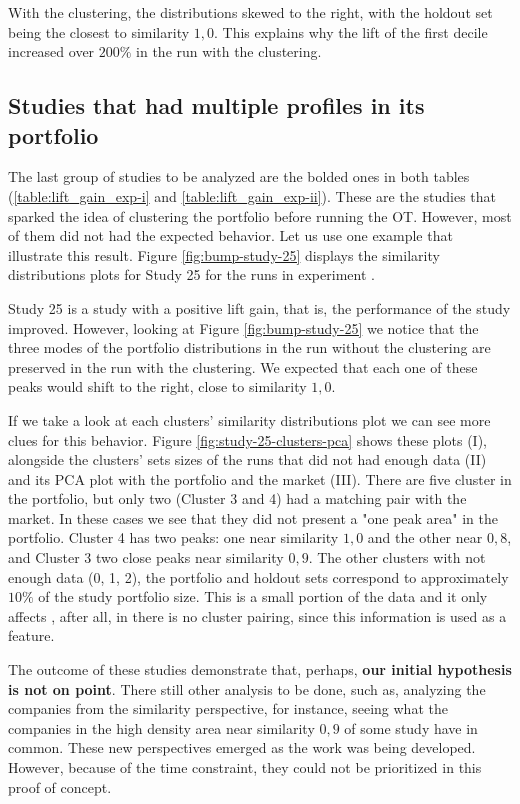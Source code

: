 With the clustering, the distributions skewed to the right, with the holdout set being the closest to similarity $1,0$. This explains why the lift of the first decile increased over $200\%$ in the run with the clustering.

\subsection{Studies that had multiple profiles in its portfolio}

The last group of studies to be analyzed are the bolded ones in both tables (\ref{table:lift_gain_exp-i} and \ref{table:lift_gain_exp-ii}). These are the studies that sparked the idea of clustering the portfolio before running the OT. However, most of them did not had the expected behavior. Let us use one example that illustrate this result. Figure \ref{fig:bump-study-25} displays the similarity distributions plots for Study 25 for the runs in experiment \nameExperimentII{}. 

Study 25 is a study with a positive lift gain, that is, the performance of the study improved. However, looking at Figure \ref{fig:bump-study-25} we notice that the three modes of the portfolio distributions in the run without the clustering are preserved in the run with the clustering. We expected that each one of these peaks would shift to the right, close to similarity $1,0$. 

If we take a look at each clusters' similarity distributions plot we can see more clues for this behavior. Figure \ref{fig:study-25-clusters-pca} shows these plots (I), alongside the clusters' sets sizes of the runs that did not had enough data (II) and its PCA plot with the portfolio and the market (III). There are five cluster in the portfolio, but only two (Cluster 3 and 4) had a matching pair with the market. In these cases we see that they did not present a "one peak area" in the portfolio. Cluster 4 has two peaks: one near similarity $1,0$ and the other near $0,8$, and Cluster 3 two close peaks near similarity $0,9$. The other clusters with not enough data (0, 1, 2), the portfolio and holdout sets correspond to approximately $10\%$ of the study portfolio size. This is a small portion of the data and it only affects \nameExperimentI{}, after all, in \nameExperimentII{} there is no cluster pairing, since this information is used as a feature.

The outcome of these studies demonstrate that, perhaps, \textbf{our initial hypothesis is not on point}. There still other analysis to be done, such as, analyzing the companies from the similarity perspective, for instance, seeing what the companies in the high density area near similarity $0,9$ of some study have in common. These new perspectives emerged as the work was being developed. However, because of the time constraint, they could not be prioritized in this proof of concept. 

